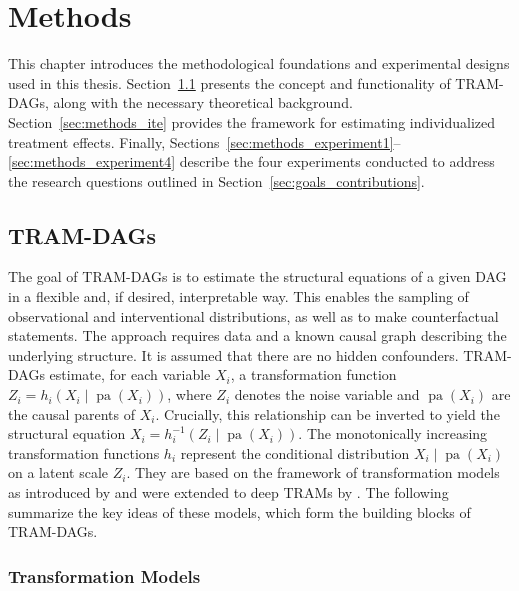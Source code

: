 




\chapter{Methods}

This chapter introduces the methodological foundations and experimental designs used in this thesis. Section~\ref{sec:methods_tram_dags} presents the concept and functionality of TRAM-DAGs, along with the necessary theoretical background. Section~\ref{sec:methods_ite} provides the framework for estimating individualized treatment effects. Finally, Sections~\ref{sec:methods_experiment1}--\ref{sec:methods_experiment4} describe the four experiments conducted to address the research questions outlined in Section~\ref{sec:goals_contributions}.


\section{TRAM-DAGs} \label{sec:methods_tram_dags}

The goal of TRAM-DAGs is to estimate the structural equations of a given DAG in a flexible and, if desired, interpretable way. This enables the sampling of observational and interventional distributions, as well as to make counterfactual statements. The approach requires data and a known causal graph describing the underlying structure. It is assumed that there are no hidden confounders. TRAM-DAGs estimate, for each variable $X_i$, a transformation function $Z_i = h_i(X_i \mid \operatorname{pa}(X_i))$, where $Z_i$ denotes the noise variable and $\operatorname{pa}(X_i)$ are the causal parents of $X_i$. Crucially, this relationship can be inverted to yield the structural equation $X_i = h_i^{-1}(Z_i \mid \operatorname{pa}(X_i))$. The monotonically increasing transformation functions $h_i$ represent the conditional distribution  $X_i \mid \operatorname{pa}(X_i)$ on a latent scale $Z_i$. They are based on the framework of transformation models as introduced by \citet{hothorn2014} and were extended to deep TRAMs by \citet{sick2020}. The following summarize the key ideas of these models, which form the building blocks of TRAM-DAGs.


\subsection{Transformation Models}


